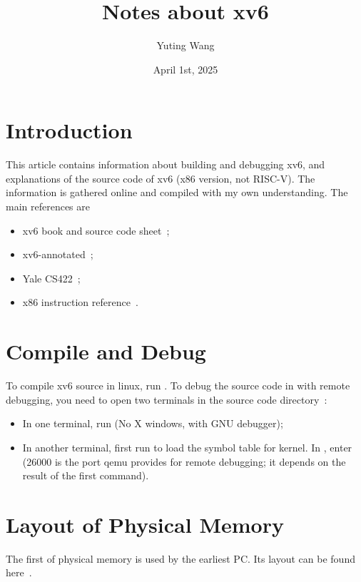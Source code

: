 \documentclass{article}
\title{Notes about xv6}
\author{Yuting Wang}
\date{April 1st, 2025}
\begin{document}
\maketitle

\section{Introduction}

This article contains information about building and debugging xv6,
and explanations of the source code of xv6 (x86 version, not
RISC-V). The information is gathered online and compiled with my own
understanding. The main references are

\begin{itemize}
\item xv6 book and source code sheet~\cite{xv6-x86};
\item xv6-annotated~\cite{xv6-annotated};
\item Yale CS422~\cite{yale-cs422};
\item x86 instruction reference~\cite{x86-reference}.
\end{itemize}

\section{Compile and Debug}

To compile xv6 source in linux, run . To debug the source
code in  with remote debugging, you need to open two
terminals in the source code directory~\cite{xv6-debug}:

\begin{itemize}
\item In one terminal, run  (No X windows,
  with GNU debugger);

\item In another terminal, first run  to load the
  symbol table for kernel. In , enter  (26000 is the port qemu provides for remote
  debugging; it depends on the result of the first command).
\end{itemize}

\section{Layout of Physical Memory}

The first  of physical memory is used by the earliest
PC. Its layout can be found here~\cite{yale-cs422-as1}.
\end{document}
